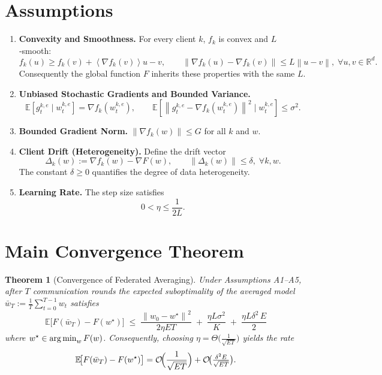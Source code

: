 \documentclass{article}
\newtheorem{theorem}{Theorem}
\newcommand{\E}{\mathbb{E}}
\newcommand{\R}{\mathbb{R}}
\newcommand{\norm}[1]{\left\|#1\right\|}
\newcommand{\inner}[1]{\left\langle #1 \right\rangle}
\newcommand{\argmin}{\operatornamewithlimits{arg\,min}}
\newcommand{\grad}{\nabla}
\begin{document}
\newpage
\section*{Assumptions}
\begin{enumerate}[label={A\arabic*}.]
    \item \textbf{Convexity and Smoothness.} For every client $k$, $f_k$ is convex and $L$‑smooth:
    \[
    f_k(u)\ge f_k(v)+\inner{\grad f_k(v)}{u-v},\qquad 
    \norm{\grad f_k(u)-\grad f_k(v)}\le L\norm{u-v},\;\forall u,v\in\R^d .
    \]
    Consequently the global function $F$ inherits these properties with the same $L$.
    \item \textbf{Unbiased Stochastic Gradients and Bounded Variance.}
    \[
    \E\!\left[g_{t}^{k,e}\mid w_{t}^{k,e}\right]=\grad f_k\!\left(w_{t}^{k,e}\right),\qquad
    \E\!\left[\norm{g_{t}^{k,e}-\grad f_k(w_{t}^{k,e})}^2\mid w_{t}^{k,e}\right]\le\sigma^2 .
    \]
    \item \textbf{Bounded Gradient Norm.} $\norm{\grad f_k(w)}\le G$ for all $k$ and $w$.
    \item \textbf{Client Drift (Heterogeneity).} Define the drift vector
    \[
    \Delta_k(w):=\grad f_k(w)-\grad F(w),\qquad 
    \norm{\Delta_k(w)}\le\delta,\;\forall k,w .
    \]
    The constant $\delta\ge0$ quantifies the degree of data heterogeneity.
    \item \textbf{Learning Rate.} The step size satisfies
    \[
    0<\eta\le \frac{1}{2L}.
    \]
\end{enumerate}

\section*{Main Convergence Theorem}
\begin{theorem}[Convergence of Federated Averaging]\label{thm:main}
Under Assumptions A1–A5, after $T$ communication rounds the expected suboptimality of the averaged model $\bar w_T:=\frac1T\sum_{t=0}^{T-1} w_t$ satisfies
\[
\boxed{
\E\!\bigl[F(\bar w_T)-F(w^\star)\bigr]\;
\le\;
\frac{\norm{w_0-w^\star}^{2}}{2\eta ET}
\;+\;
\frac{\eta L\sigma^{2}}{K}
\;+\;
\frac{\eta L\delta^{2}\,E}{2}
}
\]
where $w^\star\in\argmin_{w}F(w)$.
Consequently, choosing $\eta=\Theta\!\bigl(\tfrac{1}{\sqrt{ET}}\bigr)$ yields the rate
\[
\E\!\bigl[F(\bar w_T)-F(w^\star)\bigr]=\mathcal O\!\Bigl(\frac{1}{\sqrt{ET}}\Bigr)
      +\mathcal O\!\bigl(\tfrac{\delta^{2}E}{\sqrt{ET}}\bigr).
\]
\end{theorem}
\end{document}
